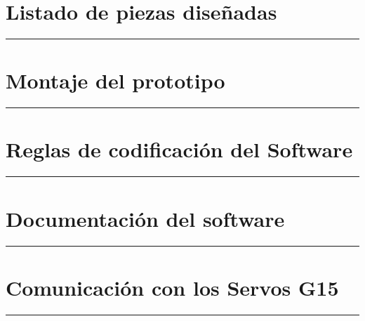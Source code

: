 \appendix
{}


     \chapter{Listado de piezas diseñadas} \label{app:listadoPiezas}
         \hrule
         \vspace{3mm}
     	 
    	
     \chapter{Montaje del prototipo} \label{app:montajePiezas}
         \hrule
         \vspace{3mm}
    	
     \chapter{Reglas de codificación del Software} \label{app:codificacionSW}
        \hrule
        \vspace{3mm}
     	
    
     \chapter{Documentación del software} \label{app:documentacion_software}
         \hrule
         \vspace{3mm}
     	 
     	 
     \chapter{Comunicación con los Servos G15} \label{app:registros_g15}
	     \hrule
	     \vspace{3mm}
	     
        
